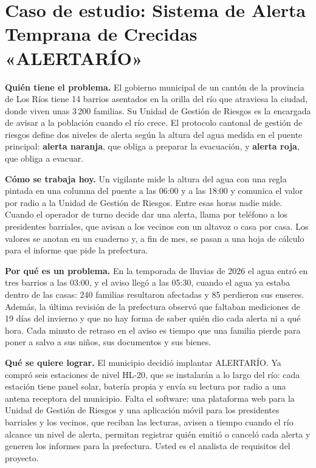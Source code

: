 \documentclass[11pt]{article}
\newcommand{\seccion}[1]{\section{\textcolor{utegreendk}{#1}}}
\begin{document}
	\seccion{Caso de estudio: Sistema de Alerta Temprana de Crecidas «ALERTARÍO»}
	
	\begin{cajacaso}[title={El problema que hay que resolver}]
		\textbf{Quién tiene el problema.} El gobierno municipal de un cantón de la provincia de Los Ríos tiene 14 barrios asentados en la orilla del río que atraviesa la ciudad, donde viven unas 3\,200 familias. Su Unidad de Gestión de Riesgos es la encargada de avisar a la población cuando el río crece. El protocolo cantonal de gestión de riesgos define dos niveles de alerta según la altura del agua medida en el puente principal: \textbf{alerta naranja}, que obliga a preparar la evacuación, y \textbf{alerta roja}, que obliga a evacuar.\par\smallskip
		\textbf{Cómo se trabaja hoy.} Un vigilante mide la altura del agua con una regla pintada en una columna del puente a las 06:00 y a las 18:00 y comunica el valor por radio a la Unidad de Gestión de Riesgos. Entre esas horas nadie mide. Cuando el operador de turno decide dar una alerta, llama por teléfono a los presidentes barriales, que avisan a los vecinos con un altavoz o casa por casa. Los valores se anotan en un cuaderno y, a fin de mes, se pasan a una hoja de cálculo para el informe que pide la prefectura.\par\smallskip
		\textbf{Por qué es un problema.} En la temporada de lluvias de 2026 el agua entró en tres barrios a las 03:00, y el aviso llegó a las 05:30, cuando el agua ya estaba dentro de las casas: 240 familias resultaron afectadas y 85 perdieron sus enseres. Además, la última revisión de la prefectura observó que faltaban mediciones de 19 días del invierno y que no hay forma de saber quién dio cada alerta ni a qué hora. Cada minuto de retraso en el aviso es tiempo que una familia pierde para poner a salvo a sus niños, sus documentos y sus bienes.\par\smallskip
		\textbf{Qué se quiere lograr.} El municipio decidió implantar ALERTARÍO. Ya compró seis estaciones de nivel HL-20, que se instalarán a lo largo del río: cada estación tiene panel solar, batería propia y envía su lectura por radio a una antena receptora del municipio. Falta el software: una plataforma web para la Unidad de Gestión de Riesgos y una aplicación móvil para los presidentes barriales y los vecinos, que reciban las lecturas, avisen a tiempo cuando el río alcance un nivel de alerta, permitan registrar quién emitió o canceló cada alerta y generen los informes para la prefectura. Usted es el analista de requisitos del proyecto.
	\end{cajacaso}
	
\end{document}
